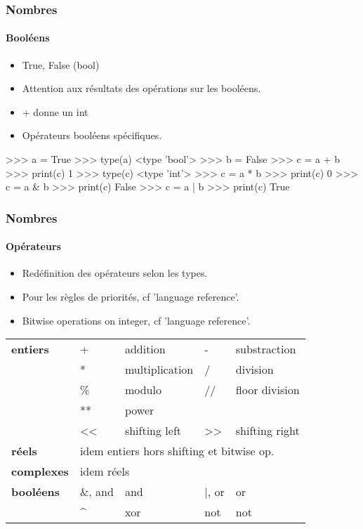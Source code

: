 \begin{frame}[fragile]
\frametitle{Nombres}
\framesubtitle{Booléens}
\begin{itemize}
 \item True, False (bool)
 \item Attention aux résultats des opérations sur les booléens.
 \item + donne un int
 \item Opérateurs booléens spécifiques.   
\end{itemize}
\begin{pythonConsole}
>>> a = True
>>> type(a)
<type 'bool'>
>>> b = False
>>> c = a + b
>>> print(c)
1
>>> type(c)
<type 'int'>
>>> c = a * b
>>> print(c)
0
>>> c = a & b  
>>> print(c)
False
>>> c = a | b
>>> print(c)
True
\end{pythonConsole}
\end{frame}
\begin{frame}
\frametitle{Nombres}
\framesubtitle{Opérateurs}
\begin{itemize}
 \item Redéfinition des opérateurs selon les types. 
 \item Pour les règles de priorités, cf 'language reference'.
 \item Bitwise operations on integer, cf 'language reference'. 
\end{itemize}

\begin{tabular}{l|ll|ll}
{\bfseries entiers} & + & addition & - & substraction \\
 &  * & multiplication & / & division \\
 & \% & modulo & // & floor division \\
 & ** & power  & & \\
 & << & shifting left & >> & shifting right \\
{\bfseries réels} & \multicolumn{4}{l}{idem entiers hors shifting et bitwise op.}\\
{\bfseries complexes} & \multicolumn{4}{l}{idem réels}\\
{\bfseries booléens} & \&, and & and & |, or & or \\
 & \^\/ & xor & not & not 
\end{tabular}
\end{frame}
